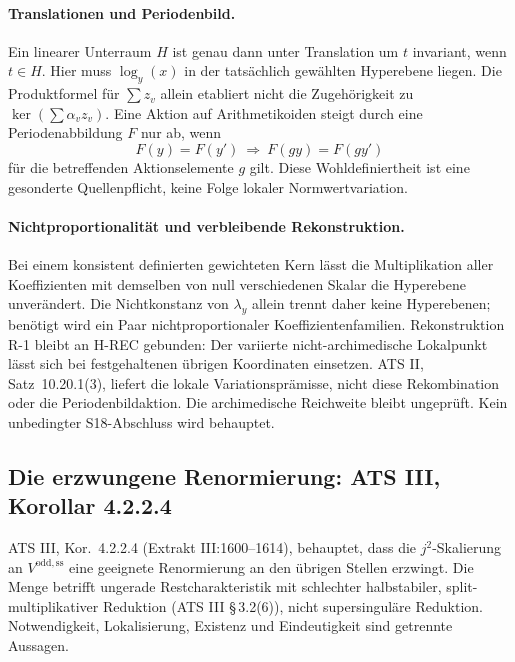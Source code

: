 \documentclass[11pt,a4paper]{article}
\theoremstyle{definition}
\theoremstyle{remark}
\begin{document}
\paragraph{Translationen und Periodenbild.}
Ein linearer Unterraum $H$ ist genau dann unter Translation um $t$
invariant, wenn $t\in H$. Hier muss $\log_y(x)$ in der tatsächlich gewählten
Hyperebene liegen. Die Produktformel für $\sum z_v$ allein etabliert nicht
die Zugehörigkeit zu $\ker(\sum\alpha_v z_v)$. Eine Aktion auf
Arithmetikoiden steigt durch eine Periodenabbildung $F$ nur ab, wenn
\[
 F(y)=F(y')\ \Longrightarrow\ F(gy)=F(gy')
\]
für die betreffenden Aktionselemente $g$ gilt. Diese Wohldefiniertheit ist
eine gesonderte Quellenpflicht, keine Folge lokaler Normwertvariation.

\paragraph{Nichtproportionalität und verbleibende Rekonstruktion.}
Bei einem konsistent definierten gewichteten Kern lässt die Multiplikation
aller Koeffizienten mit demselben von null verschiedenen Skalar die
Hyperebene unverändert. Die Nichtkonstanz von $\lambda_y$ allein trennt
daher keine Hyperebenen; benötigt wird ein Paar nichtproportionaler
Koeffizientenfamilien. Rekonstruktion R-1 bleibt an H-REC gebunden: Der
variierte nicht-archimedische Lokalpunkt lässt sich bei festgehaltenen
übrigen Koordinaten einsetzen. ATS II, Satz~10.20.1(3), liefert die lokale
Variationsprämisse, nicht diese Rekombination oder die Periodenbildaktion.
Die archimedische Reichweite bleibt ungeprüft. Kein unbedingter
S18-Abschluss wird behauptet.

\subsection{Die erzwungene Renormierung: ATS III, Korollar 4.2.2.4}\label{sec:s16}

ATS III, Kor.~4.2.2.4 (Extrakt III:1600--1614), behauptet, dass die
$j^2$-Skalierung an $V^{\mathrm{odd,ss}}$ eine geeignete Renormierung an
den übrigen Stellen erzwingt. Die Menge betrifft ungerade Restcharakteristik
mit schlechter halbstabiler, split-multiplikativer Reduktion (ATS III
\S\,3.2(6)), nicht supersinguläre Reduktion. Notwendigkeit, Lokalisierung,
Existenz und Eindeutigkeit sind getrennte Aussagen.
\end{document}
